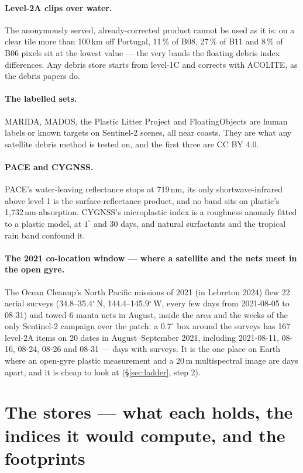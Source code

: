 \documentclass[10pt]{article}
\begin{document}
\paragraph{Level-2A clips over water.} The anonymously served, already-corrected product cannot be used as it is:
on a clear tile more than 100\,km off Portugal, 11\,\% of B08, 27\,\% of B11 and 8\,\% of B06 pixels sit at the
lowest value --- the very bands the floating debris index differences. Any debris store starts from level-1C and
corrects with ACOLITE, as the debris papers do.

\paragraph{The labelled sets.} MARIDA, MADOS, the Plastic Litter Project and FloatingObjects are human labels or
known targets on Sentinel-2 scenes, all near coasts. They are what any satellite debris method is tested on, and
the first three are CC BY 4.0.

\paragraph{PACE and CYGNSS.} PACE's water-leaving reflectance stops at 719\,nm, its only shortwave-infrared above
level 1 is the surface-reflectance product, and no band sits on plastic's 1,732\,nm absorption. CYGNSS's
microplastic index is a roughness anomaly fitted to a plastic model, at $1^\circ$ and 30 days, and natural
surfactants and the tropical rain band confound it.

\paragraph{The 2021 co-location window --- where a satellite and the nets meet in the open gyre.} The Ocean
Cleanup's North Pacific missions of 2021 (in Lebreton 2024) flew 22 aerial surveys (34.8--35.4$^\circ$\,N,
144.4--145.9$^\circ$\,W, every few days from 2021-08-05 to 08-31) and towed 6 manta nets in August, inside the area
and the weeks of the only Sentinel-2 campaign over the patch: a $0.7^\circ$ box around the surveys has 167 level-2A
items on 20 dates in August--September 2021, including 2021-08-11, 08-16, 08-24, 08-26 and 08-31 --- days with
surveys. It is the one place on Earth where an open-gyre plastic measurement and a 20\,m multispectral image are
days apart, and it is cheap to look at (\S\ref{sec:ladder}, step 2).

\section{The stores --- what each holds, the indices it would compute, and the footprints}
\end{document}
